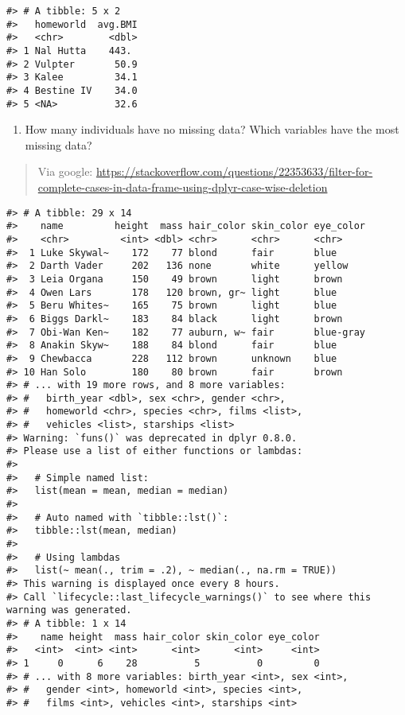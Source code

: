 \documentclass[
]{book}
\providecommand{\tightlist}{%
  \setlength{\itemsep}{0pt}\setlength{\parskip}{0pt}}
\begin{document}
\begin{verbatim}
#> # A tibble: 5 x 2
#>   homeworld  avg.BMI
#>   <chr>        <dbl>
#> 1 Nal Hutta    443. 
#> 2 Vulpter       50.9
#> 3 Kalee         34.1
#> 4 Bestine IV    34.0
#> 5 <NA>          32.6
\end{verbatim}

\begin{enumerate}
\def\labelenumi{\arabic{enumi}.}
\setcounter{enumi}{9}
\tightlist
\item
  How many individuals have no missing data? Which variables have the most missing data?
\end{enumerate}

\begin{quote}
Via google: \url{https://stackoverflow.com/questions/22353633/filter-for-complete-cases-in-data-frame-using-dplyr-case-wise-deletion}
\end{quote}

\begin{verbatim}
#> # A tibble: 29 x 14
#>    name         height  mass hair_color skin_color eye_color
#>    <chr>         <int> <dbl> <chr>      <chr>      <chr>    
#>  1 Luke Skywal~    172    77 blond      fair       blue     
#>  2 Darth Vader     202   136 none       white      yellow   
#>  3 Leia Organa     150    49 brown      light      brown    
#>  4 Owen Lars       178   120 brown, gr~ light      blue     
#>  5 Beru Whites~    165    75 brown      light      blue     
#>  6 Biggs Darkl~    183    84 black      light      brown    
#>  7 Obi-Wan Ken~    182    77 auburn, w~ fair       blue-gray
#>  8 Anakin Skyw~    188    84 blond      fair       blue     
#>  9 Chewbacca       228   112 brown      unknown    blue     
#> 10 Han Solo        180    80 brown      fair       brown    
#> # ... with 19 more rows, and 8 more variables:
#> #   birth_year <dbl>, sex <chr>, gender <chr>,
#> #   homeworld <chr>, species <chr>, films <list>,
#> #   vehicles <list>, starships <list>
#> Warning: `funs()` was deprecated in dplyr 0.8.0.
#> Please use a list of either functions or lambdas: 
#> 
#>   # Simple named list: 
#>   list(mean = mean, median = median)
#> 
#>   # Auto named with `tibble::lst()`: 
#>   tibble::lst(mean, median)
#> 
#>   # Using lambdas
#>   list(~ mean(., trim = .2), ~ median(., na.rm = TRUE))
#> This warning is displayed once every 8 hours.
#> Call `lifecycle::last_lifecycle_warnings()` to see where this warning was generated.
#> # A tibble: 1 x 14
#>    name height  mass hair_color skin_color eye_color
#>   <int>  <int> <int>      <int>      <int>     <int>
#> 1     0      6    28          5          0         0
#> # ... with 8 more variables: birth_year <int>, sex <int>,
#> #   gender <int>, homeworld <int>, species <int>,
#> #   films <int>, vehicles <int>, starships <int>
\end{verbatim}
\end{document}
